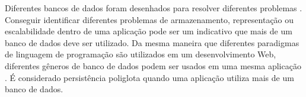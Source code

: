 Diferentes bancos de dados foram desenhados para resolver diferentes problemas \cite{NoSQL}. Conseguir identificar diferentes problemas de armazenamento, representação ou escalabilidade dentro de uma aplicação pode ser um indicativo que mais de um banco de dados deve ser utilizado. Da mesma maneira que diferentes paradigmas de linguagem de programação são utilizados em um desenvolvimento Web, diferentes gêneros de banco de dados podem ser usados em uma mesma aplicação \cite{multiparadigma}. É considerado persistência poliglota quando uma aplicação utiliza mais de um banco de dados.


